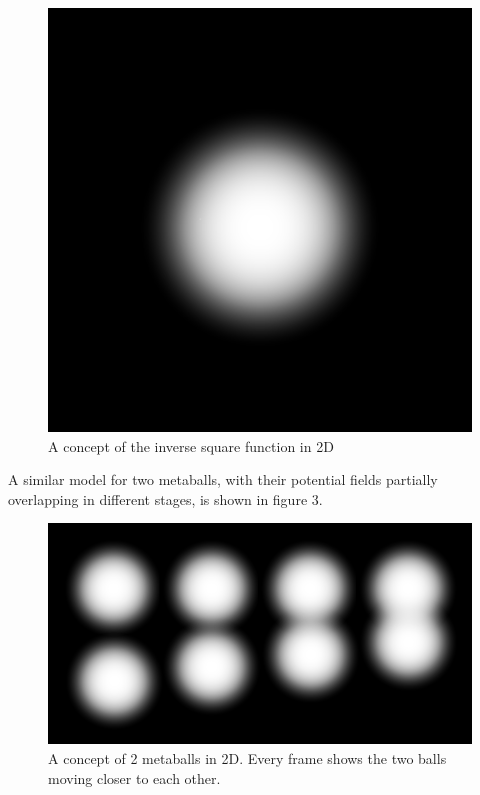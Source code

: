 \documentclass{article}
\begin{document}
            \begin{figure}[H]
                \begin{center}
                \includegraphics[width=0.6\linewidth]{img/2d-potential.png}
                \caption{A concept of the inverse square function in 2D}
                \label{fig:2d-potential}
                \end{center}
            \end{figure}

            A similar model for two metaballs, with their potential fields partially overlapping in different stages, is shown in figure 3.
            
            \begin{figure}[H]
                \begin{center}
                \includegraphics[width=\linewidth]{img/2d-potential-multi.png}
                \caption{A concept of 2 metaballs in 2D. Every frame shows the two balls moving closer to each other.}
                \label{fig:2d-potential-multi}
                \end{center}
            \end{figure}
\end{document}
